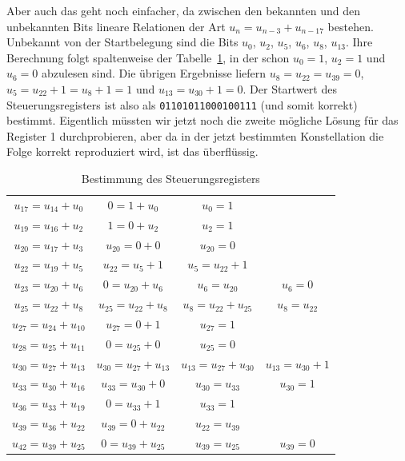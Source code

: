 \begin{refsegment}
Aber auch das geht noch einfacher, da zwischen den bekannten und
den unbekannten Bits lineare Relationen der Art $u_n = u_{n-3} + u_{n-17}$
bestehen. Unbekannt von der Startbelegung sind die Bits
$u_0$, $u_2$, $u_5$, $u_6$, $u_8$, $u_{13}$. Ihre Berechnung folgt
spaltenweise der Tabelle~\ref{tab-bool-gef_ana3}, in der schon
$u_0 = 1$, $u_2 = 1$ und $u_6 = 0$ abzulesen sind. Die übrigen
Ergebnisse liefern $u_8 = u_{22} = u_{39} = 0$,
$u_5 = u_{22} + 1 = u_8 + 1 = 1$ und $u_{13} = u_{30} + 1 = 0$.
Der Startwert des Steuerungsregisters ist also als
{\tt 01101011000100111} (und somit korrekt) bestimmt.
Eigentlich müssten wir jetzt noch die zweite mögliche Lösung
für das Register 1 durchprobieren, aber da in der jetzt bestimmten
Konstellation die Folge korrekt reproduziert wird, ist das überflüssig.

\begin{table}
\begin{center}
\begin{tabular}{c|c|c|c}
   $u_{17}=u_{14}+u_0$    & $0=1+u_0$              & $u_0=1$                &                   \\
   $u_{19}=u_{16}+u_2$    & $1=0+u_2$              & $u_2=1$                &                   \\
   $u_{20}=u_{17}+u_3$    & $u_{20}=0+0$           & $u_{20}=0$             &                   \\
   $u_{22}=u_{19}+u_5$    & $u_{22}=u_5+1$         & $u_5=u_{22}+1$         &                   \\
   $u_{23}=u_{20}+u_6$    & $0=u_{20}+u_6$         & $u_6=u_{20}$           & $u_6=0$           \\
   $u_{25}=u_{22}+u_8$    & $u_{25}=u_{22}+u_8$    & $u_8=u_{22}+u_{25}$    & $u_8=u_{22}$      \\
   $u_{27}=u_{24}+u_{10}$ & $u_{27}=0+1$           & $u_{27}=1$             &                   \\
   $u_{28}=u_{25}+u_{11}$ & $0=u_{25}+0$           & $u_{25}=0$             &                   \\
   $u_{30}=u_{27}+u_{13}$ & $u_{30}=u_{27}+u_{13}$ & $u_{13}=u_{27}+u_{30}$ & $u_{13}=u_{30}+1$ \\
   $u_{33}=u_{30}+u_{16}$ & $u_{33}=u_{30}+0$      & $u_{30}=u_{33}$        & $u_{30}=1$        \\
   $u_{36}=u_{33}+u_{19}$ & $0=u_{33}+1$           & $u_{33}=1$             &                   \\
   $u_{39}=u_{36}+u_{22}$ & $u_{39}=0+u_{22}$      & $u_{22}=u_{39}$        &                   \\
   $u_{42}=u_{39}+u_{25}$ & $0=u_{39}+u_{25}$      & $u_{39}=u_{25}$        & $u_{39}=0$
\end{tabular}
\end{center}
\caption{Bestimmung des Steuerungsregisters}\label{tab-bool-gef_ana3}
\end{table}


\end{refsegment}
